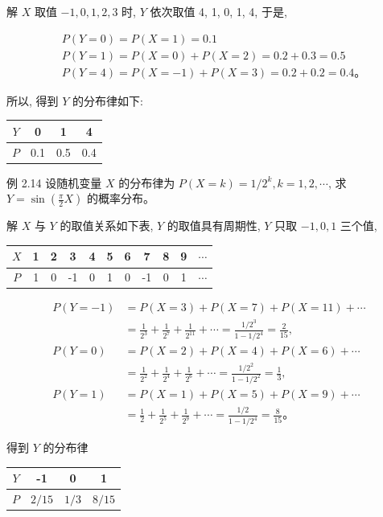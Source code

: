 \documentclass{beamer}
\begin{document}
	\begin{frame}
		解 $X$ 取值 $-1,0,1,2,3$ 时, $Y$ 依次取值 4, 1, 0, 1, 4, 于是,
		
		$$
		\begin{aligned}
			& P(Y=0)=P(X=1)=0.1 \\
			& P(Y=1)=P(X=0)+P(X=2)=0.2+0.3=0.5 \\
			& P(Y=4)=P(X=-1)+P(X=3)=0.2+0.2=0.4 。
		\end{aligned}
		$$
		
		所以, 得到 $Y$ 的分布律如下:
		\begin{center}
			\begin{tabular}{c|ccc}
				$Y$ & 0 & 1 & 4 \\
				\hline
				$P$ & 0.1 & 0.5 & 0.4 \\
			\end{tabular}
		\end{center}
	\end{frame}
	
	\begin{frame}
		例 2.14 设随机变量 $X$ 的分布律为 $P(X=k)=1 / 2^{k}, k=1,2, \cdots$, 求 $Y=\sin \left(\frac{\pi}{2} X\right)$ 的概率分布。
	\end{frame}
	
	\begin{frame}
		解 $X$ 与 $Y$ 的取值关系如下表, $Y$ 的取值具有周期性, $Y$ 只取 $-1,0,1$ 三个值,
		\begin{center}
			\begin{tabular}{c|cccccccccc}
				$X$ & 1 & 2 & 3 & 4 & 5 & 6 & 7 & 8 & 9 & $\cdots$ \\
				\hline
				$P$ & 1 & 0 & -1 & 0 & 1 & 0 & -1 & 0 & 1 & $\cdots$ \\
			\end{tabular}
		\end{center}
		$$
		\begin{aligned}
			P(Y=-1) & =P(X=3)+P(X=7)+P(X=11)+\cdots \\
			& =\frac{1}{2^{3}}+\frac{1}{2^{7}}+\frac{1}{2^{11}}+\cdots=\frac{1 / 2^{3}}{1-1 / 2^{4}}=\frac{2}{15}, \\
			P(Y=0) & =P(X=2)+P(X=4)+P(X=6)+\cdots \\
			& =\frac{1}{2^{2}}+\frac{1}{2^{4}}+\frac{1}{2^{6}}+\cdots=\frac{1 / 2^{2}}{1-1 / 2^{2}}=\frac{1}{3}, \\
			P(Y=1) & =P(X=1)+P(X=5)+P(X=9)+\cdots \\
			& =\frac{1}{2}+\frac{1}{2^{5}}+\frac{1}{2^{9}}+\cdots=\frac{1 / 2}{1-1 / 2^{4}}=\frac{8}{15} 。
		\end{aligned}
		$$
		
		得到 $Y$ 的分布律
		\begin{center}
			\begin{tabular}{c|ccc}
				$Y$ & -1 & 0 & 1 \\
				\hline
				$P$ & $2 / 15$ & $1 / 3$ & $8 / 15$ \\
			\end{tabular}
		\end{center}
	\end{frame}
	
\end{document}
